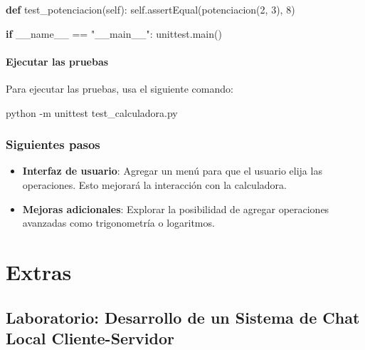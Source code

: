 \documentclass[
  a4paper,
  DIV=11,
  numbers=noendperiod,
  onepage,
  openany]{scrreprt}
\newenvironment{Shaded}{\begin{snugshade}}{\end{snugshade}}
\newcommand{\AttributeTok}[1]{\textcolor[rgb]{0.40,0.45,0.13}{#1}}
\newcommand{\ControlFlowTok}[1]{\textcolor[rgb]{0.00,0.23,0.31}{\textbf{#1}}}
\newcommand{\DecValTok}[1]{\textcolor[rgb]{0.68,0.00,0.00}{#1}}
\newcommand{\ExtensionTok}[1]{\textcolor[rgb]{0.00,0.23,0.31}{#1}}
\newcommand{\KeywordTok}[1]{\textcolor[rgb]{0.00,0.23,0.31}{\textbf{#1}}}
\newcommand{\NormalTok}[1]{\textcolor[rgb]{0.00,0.23,0.31}{#1}}
\newcommand{\OperatorTok}[1]{\textcolor[rgb]{0.37,0.37,0.37}{#1}}
\newcommand{\StringTok}[1]{\textcolor[rgb]{0.13,0.47,0.30}{#1}}
\newcommand{\VariableTok}[1]{\textcolor[rgb]{0.07,0.07,0.07}{#1}}
\providecommand{\tightlist}{%
  \setlength{\itemsep}{0pt}\setlength{\parskip}{0pt}}\usepackage{longtable,booktabs,array}
\begin{document}
\begin{Shaded}
\begin{Highlighting}[]
    \KeywordTok{def}\NormalTok{ test\_potenciacion(}\VariableTok{self}\NormalTok{):}
        \VariableTok{self}\NormalTok{.assertEqual(potenciacion(}\DecValTok{2}\NormalTok{, }\DecValTok{3}\NormalTok{), }\DecValTok{8}\NormalTok{)}

\ControlFlowTok{if} \VariableTok{\_\_name\_\_} \OperatorTok{==} \StringTok{"\_\_main\_\_"}\NormalTok{:}
\NormalTok{    unittest.main()}
\end{Highlighting}
\end{Shaded}

\subsection{Ejecutar las pruebas}\label{ejecutar-las-pruebas}

Para ejecutar las pruebas, usa el siguiente comando:

\begin{Shaded}
\begin{Highlighting}[]
\ExtensionTok{python} \AttributeTok{{-}m}\NormalTok{ unittest test\_calculadora.py}
\end{Highlighting}
\end{Shaded}

\section{Siguientes pasos}\label{siguientes-pasos}

\begin{itemize}
\tightlist
\item
  \textbf{Interfaz de usuario}: Agregar un menú para que el usuario
  elija las operaciones. Esto mejorará la interacción con la
  calculadora.
\item
  \textbf{Mejoras adicionales}: Explorar la posibilidad de agregar
  operaciones avanzadas como trigonometría o logaritmos.
\end{itemize}

\part{Extras}

\chapter{Laboratorio: Desarrollo de un Sistema de Chat Local
Cliente-Servidor}\label{laboratorio-desarrollo-de-un-sistema-de-chat-local-cliente-servidor}
\end{document}
